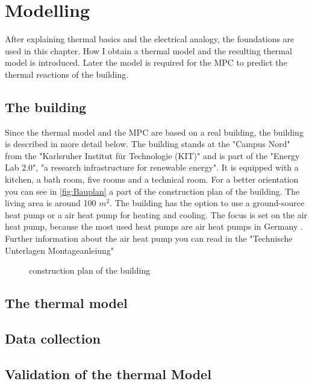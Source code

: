 \chapter{Modelling}
\label{ch:modelling}
After explaining thermal basics and the electrical analogy, the foundations are used in this chapter. How I obtain a thermal model and the resulting thermal model is introduced. Later the model is required for the MPC to predict the thermal reactions of the building. 

\section{The building}
\label{section:building}
Since the thermal model and the MPC are based on a real building, the building is described in more detail below.
\newline
The building stands at the "Campus Nord" from the "Karlsruher Institut für Technologie (KIT)" and is part of the "Energy Lab 2.0", "a research infrastructure for renewable energy"\cite{KIT.2021}. It is equipped with a kitchen, a bath room, five rooms and a technical room. For a better orientation you can see in \autoref{fig:Bauplan} a part of the construction plan of the building. The living area is around 100 $m^2$. The building has the option to use a ground-source heat pump or a air heat pump for heating and cooling. The focus is set on the air heat pump, because the most used heat pumps are air heat pumps in Germany \cite{bwp.2021}. Further information about the air heat pump you can read in the "Technische Unterlagen Montageanleiung" 

\begin{figure}
    \centering
    \def\svgwidth{320pt}
    
    \caption{construction plan of the building \cite{Bauplan}}
    \label{fig:Bauplan}
\end{figure}

\section{The thermal model}
\label{thermalmodel}

\section{Data collection}

\section{Validation of the thermal Model}
\label{validationthermalmodel}




